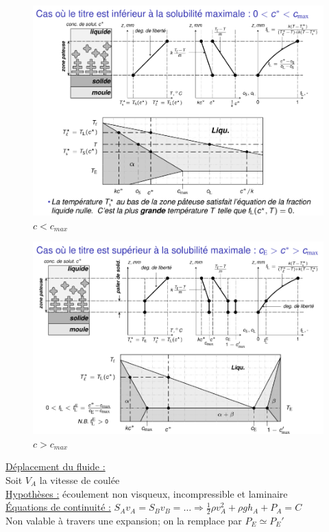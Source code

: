 \documentclass[../main.tex]{subfiles}
\begin{document}
\begin{figure}
    \centering
    \includegraphics[width=\textwidth]{IMAGES/procprod/proc62.png}
    \caption{$c<c_{max}$}
\end{figure}

\begin{figure}
    \centering
    \includegraphics[width=\textwidth]{IMAGES/procprod/proc61.png}
    \caption{$c>c_{max}$}
\end{figure}

\quad \underline{Déplacement du fluide :}\\
Soit $V_A$ la vitesse de coulée\\
\underline{Hypothèses :} écoulement non visqueux, incompressible et laminaire\\
\underline{Équations de continuité :} $S_Av_A = S_Bv_B = \dots \Rightarrow \frac{1}{2}\rho v_A^2+\rho g h_A + P_A = C$\\
\warning Non valable à travers une expansion; on la remplace par $P_E \simeq P_E'$\\
\end{document}
